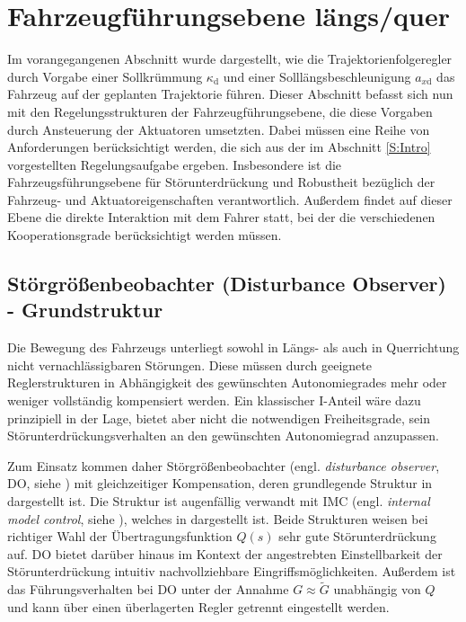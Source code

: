 \section{Fahrzeugführungsebene längs/quer}
\label{ch_Fahrzeugführungsebene}

Im vorangegangenen Abschnitt wurde dargestellt, wie die Trajektorienfolgeregler durch Vorgabe einer Sollkrümmung $\kappa_\mathrm{d}$ und einer Solllängsbeschleunigung $a_{x\mathrm{d}}$ das Fahrzeug auf der geplanten Trajektorie führen. Dieser Abschnitt befasst sich nun mit den Regelungsstrukturen der Fahrzeugführungsebene, die diese Vorgaben durch Ansteuerung der Aktuatoren umsetzten. Dabei müssen eine Reihe von Anforderungen berücksichtigt werden, die sich aus der im Abschnitt \ref{S:Intro} vorgestellten Regelungsaufgabe ergeben. Insbesondere ist die Fahrzeugsführungsebene für Störunterdrückung und Robustheit bezüglich der Fahrzeug- und Aktuatoreigenschaften verantwortlich. Außerdem findet auf dieser Ebene die direkte Interaktion mit dem Fahrer statt, bei der die verschiedenen Kooperationsgrade berücksichtigt werden müssen.

\subsection{Störgrößenbeobachter (Disturbance Observer) - Grundstruktur}\label{subS:DO_Basic}

Die Bewegung des Fahrzeugs unterliegt sowohl in Längs- als auch in Querrichtung nicht vernachlässigbaren Störungen. Diese müssen durch geeignete Reglerstrukturen in Abhängigkeit des gewünschten Autonomiegrades mehr oder weniger vollständig kompensiert werden.
Ein klassischer I-Anteil wäre dazu prinzipiell in der Lage, bietet aber nicht die notwendigen Freiheitsgrade, sein Störunterdrückungsverhalten an den gewünschten Autonomiegrad anzupassen.

 
Zum Einsatz kommen daher Störgrößenbeobachter (engl. \emph{disturbance observer}, DO, siehe \cite{Ohnishi1987}) mit gleichzeitiger Kompensation, deren grundlegende Struktur in  dargestellt ist. Die Struktur ist augenfällig verwandt mit IMC (engl. \emph{internal model control}, siehe \cite{GarciaMorari82}), welches in  dargestellt ist. Beide Strukturen weisen bei richtiger Wahl der Übertragungsfunktion $Q(s)$ sehr gute Störunterdrückung auf. DO bietet darüber hinaus im Kontext der angestrebten Einstellbarkeit der Störunterdrückung intuitiv nachvollziehbare Eingriffsmöglichkeiten. Außerdem ist das Führungsverhalten bei DO unter der Annahme $G\approx\tilde G$ unabhängig von $Q$ und kann über einen überlagerten Regler getrennt eingestellt werden.


